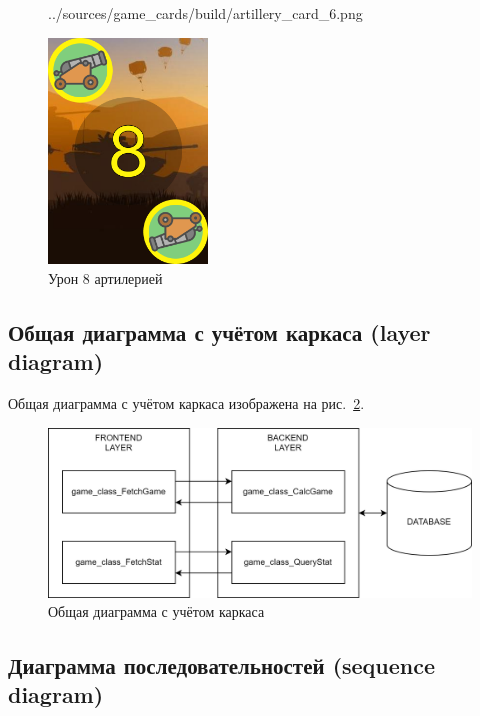 \documentclass[12pt, a4paper, simple]{eskdtext}
\begin{document}
\begin{figure}[p!h]
\begin{minipage}{0.24\textwidth}
                {../sources/game_cards/build/artillery_card_6.png}
            \caption{Урон 6 артилерией}
            \label{fig:artillery_card_6}
        \end{minipage}
        \begin{minipage}{0.24\textwidth}
            \centering
            \includegraphics[height=6cm]
                {../sources/game_cards/build/artillery_card_8.png}
            \caption{Урон 8 артилерией}
            \label{fig:artillery_card_8}
        \end{minipage}
    \end{figure}

    \newpage
    \subsection{Общая диаграмма с учётом каркаса (layer diagram)}

    Общая диаграмма с учётом каркаса изображена на рис.~\ref{fig:game__layers_diagram}.

    \begin{figure}[!h]
        \centering
        \includegraphics[width=12cm]
            {../sources/game_architecture/build/game__layers_diagram.png}
        \caption{Общая диаграмма с учётом каркаса}
        \label{fig:game__layers_diagram}
    \end{figure}

    \subsection{Диаграмма последовательностей (sequence diagram)}
\end{document}
